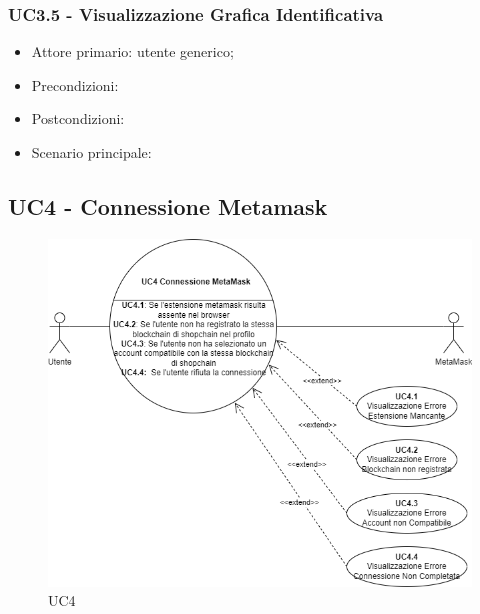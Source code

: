 \subsubsection{UC3.5 - Visualizzazione Grafica Identificativa}

\begin{itemize}
    \item Attore primario: utente generico;
    \item Precondizioni: 
    \item Postcondizioni: 
    \item Scenario principale:
\end{itemize}

\subsection{UC4 - Connessione Metamask}

\begin{figure}[H]
    \centering
    \includegraphics[scale=0.7]{immagini/UseCases-UC4.png}
    \caption{UC4}
\end{figure}

